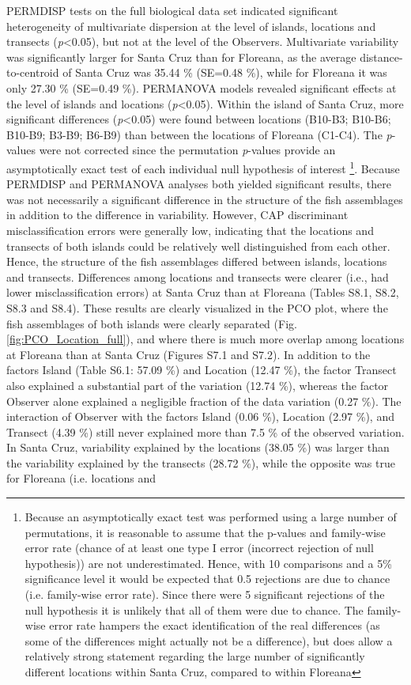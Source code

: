 PERMDISP tests on the full biological data set indicated significant heterogeneity of multivariate dispersion at the level of islands, locations and transects (\textit{p}<0.05), but not at the level of the Observers. Multivariate variability was significantly larger for Santa Cruz than for Floreana, as the average distance-to-centroid of Santa Cruz was 35.44 \% (SE=0.48 \%), while for Floreana it was only 27.30 \% (SE=0.49 \%). PERMANOVA models revealed significant effects at the level of islands and locations (\textit{p}<0.05). Within the island of Santa Cruz, more significant differences (\textit{p}<0.05) were found between locations (B10-B3; B10-B6; B10-B9; B3-B9; B6-B9) than between the locations of Floreana (C1-C4). The \textit{p}-values were not corrected since the permutation \textit{p}-values provide an asymptotically exact test of each individual null hypothesis of interest \citep{Anderson2008PERMANOVA+Methods}\footnote{Because an asymptotically exact test was performed using a large number of permutations, it is reasonable to assume that the p-values and family-wise error rate (chance of at least one type I error (incorrect rejection of null hypothesis)) are not underestimated. Hence, with 10 comparisons and a 5\% significance level it would be expected that 0.5 rejections are due to chance (i.e. family-wise error rate). Since there were 5 significant rejections of the null hypothesis it is unlikely that all of them were due to chance. The family-wise error rate hampers the exact identification of the real differences (as some of the differences might actually not be a difference), but does allow a relatively strong statement regarding the large number of significantly different locations within Santa Cruz, compared to within Floreana}. Because PERMDISP and PERMANOVA analyses both yielded significant results, there was not necessarily a significant difference in the structure of the fish assemblages in addition to the difference in variability. However, CAP discriminant misclassification errors were generally low, indicating that the locations and transects of both islands could be relatively well distinguished from each other. Hence, the structure of the fish assemblages differed between islands, locations and transects. Differences among locations and transects were clearer (i.e., had lower misclassification errors) at Santa Cruz than at Floreana (Tables S8.1, S8.2, S8.3 and S8.4). These results are clearly visualized in the PCO plot, where the fish assemblages of both islands were clearly separated (Fig. \ref{fig:PCO_Location_full}), and where there is much more overlap among locations at Floreana than at Santa Cruz (Figures S7.1 and S7.2). In addition to the factors Island (Table S6.1: 57.09 \%) and Location (12.47 \%), the factor Transect also explained a substantial part of the variation (12.74 \%), whereas the factor Observer alone explained a negligible fraction of the data variation (0.27 \%). The interaction of Observer with the factors Island (0.06 \%), Location (2.97 \%), and Transect (4.39 \%) still never explained more than 7.5 \% of the observed variation. In Santa Cruz, variability explained by the locations (38.05 \%) was larger than the variability explained by the transects (28.72 \%), while the opposite was true for Floreana (i.e. locations and 